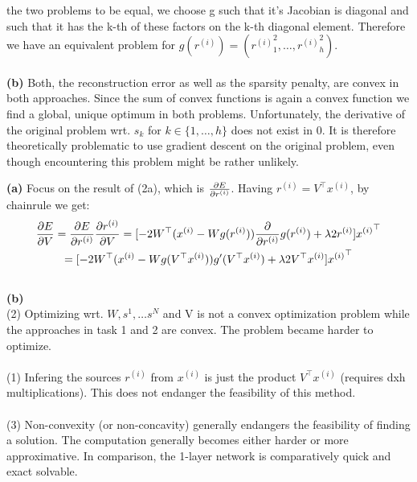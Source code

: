 \documentclass[a4paper]{article}
\newcommand{\rhi}{{r^{(i)}}}
\newcommand{\xhi}{{x^{(i)}}}
\newcommand{\1}{\mathds{1}}
\begin{document}
the two problems to be equal, we choose g such that it's Jacobian is 
diagonal and such that it has the k-th of these factors on the k-th diagonal element.  
Therefore we have an equivalent problem for $g(\rhi) = (\rhi_1^2, \ldots, \rhi_h^2)$.
\\
\\
\textbf{(b)}
Both, the reconstruction error as well as the sparsity penalty, are 
convex in both approaches. Since the sum of convex functions is again a convex 
function we find a global, unique optimum in both problems. 
Unfortunately, the derivative of the original problem wrt. $s_k$ 
for $k\in\{1,\ldots,h\}$ does not exist in 0. It is therefore theoretically 
problematic to use gradient descent on the original problem, even though 
encountering this problem might be rather unlikely. 

\newpage
{}
\textbf{(a)}
Focus on the result of (2a), which is ${\partial E\over\partial \rhi}$. 
Having $\rhi=V^\top\xhi$, by chainrule we get:
\begin{gather*}
{\partial E\over\partial V} 
= {\partial E\over\partial\rhi} {\partial\rhi\over\partial V}
= [-2 W^\top(\xhi-Wg(\rhi)){\partial\over\partial \rhi}g(\rhi) +	
	\lambda 2\rhi] \xhi^\top
\\
= [-2 W^\top(\xhi-Wg(V^\top\xhi))g'(V^\top\xhi) +
	\lambda 2V^\top\xhi] \xhi^\top
\end{gather*}
\\
\textbf{(b)}
\\
(2) Optimizing wrt. $W,s^1,\ldots s^N$ and V is not a convex 
optimization problem while the approaches in task 1 and 2 are convex. 
The problem became harder to optimize. 
\\
\\
(1)
Infering the sources $\rhi$ from $\xhi$ is just the product $V^\top\xhi$ 
(requires dxh multiplications). This does not endanger the feasibility of this method.
\\
\\
(3)
Non-convexity (or non-concavity) generally endangers 
the feasibility of finding a solution. The computation generally becomes 
either harder or more approximative. In comparison, the 1-layer network 
is comparatively quick and exact solvable. 
\end{document}
